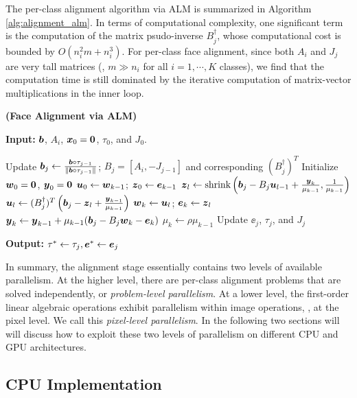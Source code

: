 \documentclass[10pt,twocolumn,letterpaper]{article}
\begin{document}
The per-class alignment algorithm via ALM is summarized in Algorithm \ref{alg:alignment_alm}. In terms of computational complexity, one significant term is the computation of the matrix psudo-inverse $B_j^\dagger$, whose computational cost is bounded by $O(n_i^2m + n_i^3)$. For per-class face alignment, since both $A_i$ and $J_{j}$ are very tall matrices (\ie, $m\gg n_i$ for all $i=1, \cdots, K$ classes), we find that the computation time is still dominated by the iterative computation of matrix-vector multiplications in the inner loop.
\begin{algorithm}[ht!]
\caption{\bf (Face Alignment via ALM)} \label{alg:alignment_alm}
{\bf Input:} ${\boldsymbol{b}}$, $A_i$, ${\boldsymbol{x}}_0 = \boldsymbol{0}$, $\tau_0$, and $J_0$.
\begin{algorithmic}[1]
\STATE Update ${\boldsymbol{b}}_j \leftarrow \frac{{\boldsymbol{b}}\circ \tau_{j-1}}{\|{\boldsymbol{b}}\circ \tau_{j-1}\|}$; $B_j= [A_i, -J_{j-1}]$ and corresponding $(B_j^\dagger)^T$
\STATE Initialize ${\boldsymbol{w}}_0 = \boldsymbol 0$, ${\boldsymbol{y}}_0 = \boldsymbol 0$
\STATE ${\boldsymbol{u}}_0\leftarrow {\boldsymbol{w}}_{k-1}$; ${\boldsymbol{z}}_0\leftarrow {\boldsymbol{e}}_{k-1}$
\STATE ${\boldsymbol{z}}_l \leftarrow \mbox{shrink}\left({\boldsymbol{b}}_j - B_j{\boldsymbol{u}}_{l-1} + \frac{{\boldsymbol{y}}_{k}}{\mu_{k-1}}, \frac{1}{\mu_{k-1}}\right)$
\STATE ${\boldsymbol{u}}_l \leftarrow (B_j^\dagger)^T \left({\boldsymbol{b}}_j - {\boldsymbol{z}}_{l} + \frac{{\boldsymbol{y}}_{k-1}}{\mu_{k-1}} \right) $
\ENDWHILE
\STATE ${\boldsymbol{w}}_k \leftarrow {\boldsymbol{u}}_l$; ${\boldsymbol{e}}_k \leftarrow {\boldsymbol{z}}_l$
\STATE ${\boldsymbol{y}}_{k} \leftarrow {\boldsymbol{y}}_{k-1} + \mu_{k-1} ({\boldsymbol{b}}_j - B_j{\boldsymbol{w}}_{k} - \boldsymbol{e}_{k})$
\STATE $\mu_{k} \leftarrow \rho\mu_{k-1}$
\ENDWHILE
\STATE Update $\ee_j$, $\tau_j$, and $J_j$
\ENDWHILE
\end{algorithmic}
{\bf Output:} $\tau^*\leftarrow \tau_j, \boldsymbol{e}^*\leftarrow {\boldsymbol{e}}_j$
\end{algorithm}

In summary, the alignment stage essentially contains two levels of available
parallelism. At the higher level, there are per-class alignment problems
that are solved independently, or \emph{problem-level parallelism}.  At a lower
level, the first-order linear algebraic operations exhibit parallelism within
image operations, \ie, at the pixel level.  We call this \emph{pixel-level
parallelism}.  In the following two sections will will discuss how to
exploit these two levels of parallelism on different CPU and GPU architectures.

\subsection{CPU Implementation} 
\label{sec:alignment_implementation_cpu}
\end{document}

